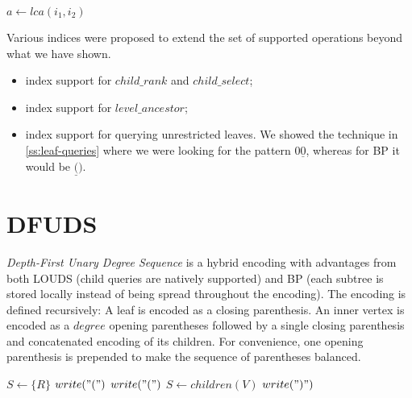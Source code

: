\begin{algorithmic}
	\State $a \gets lca(i_1, i_2)$
	\State {}
\EndFunction
\end{algorithmic}

\begin{algorithmic}
	\State {}
\EndFunction
\end{algorithmic}

\begin{algorithmic}
	\State {}
\EndFunction
\end{algorithmic}

\bigskip

Various indices were proposed to extend the set of supported operations beyond what we have shown.
\begin{itemize}
	\item index support for $child\_rank$ and $child\_select$;
	\item index support for $level\_ancestor$;
	\item index support for querying unrestricted leaves.
	We showed the technique in \ref{ss:leaf-queries} where we were looking for the pattern $0\underline{0}$, whereas for BP it would be $\underline{(})$.
\end{itemize}

\section{DFUDS}

\emph{Depth-First Unary Degree Sequence} is a hybrid encoding with advantages from both LOUDS (child queries are natively supported) and BP (each subtree is stored locally instead of being spread throughout the encoding).
The encoding is defined recursively:
A leaf is encoded as a closing parenthesis.
An inner vertex is encoded as a $degree$ opening parentheses followed by a single closing parenthesis and concatenated encoding of its children.
For convenience, one opening parenthesis is prepended to make the sequence of parentheses balanced.


\begin{algorithmic}
	\State $S \gets \{R\}$ 
	\State $write("(")$
				\State $write("(")$
			\EndFor
			\State $ S \gets children(V)$
			\State $write(")")$
	\EndWhile
\EndFunction
\end{algorithmic}

